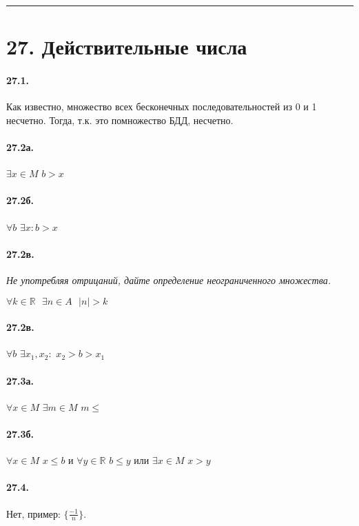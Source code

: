 \documentclass{book}
\begin{document}
\medskip\hrule\medskip
\section*{27. Действительные числа}

\paragraph{27.1.}
Как известно, множество всех бесконечных последовательностей из 0 и 1 несчетно. Тогда, т.к. это помножество БДД, несчетно.

\paragraph{27.2а.}
$\exists x \in M$ $b > x$

\paragraph{27.2б.}
$\forall b$ $\exists x: b > x$

\paragraph{27.2в.}
\textit{Не употребляя отрицаний, дайте определение неограниченного множества.}

$\forall k \in \mathbb{R} \text{ } \exists n \in A \text{ } |n| > k$

\paragraph{27.2в.}
$\forall b$ $\exists x_1, x_2:$ $x_2 > b > x_1$

\paragraph{27.3а.}
$\forall x \in M$ $\exists m \in M$ $m \le$

\paragraph{27.3б.}
$\forall x \in M$ $x \le b$ и $\forall y \in \mathbb{R}$ $b \le y$ или $\exists x \in M$ $x > y$

\paragraph{27.4.}
Нет, пример: $\{\frac{-1}{n}\}$.
\end{document}
